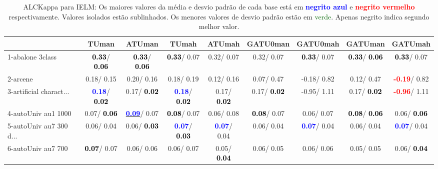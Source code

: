 \begin{table}[h]
\caption{ALCKappa para IELM: Os maiores valores da média e desvio padrão de cada base está em \textcolor{blue}{\textbf{negrito azul}} e \textcolor{red}{\textbf{negrito vermelho}} respectivamente. Valores isolados estão sublinhados. Os menores valores de desvio padrão estão em \textcolor{darkgreen}{verde}. Apenas negrito indica segundo melhor valor.}
\begin{center}\begin{tabular}{lc|c|c|c|c|c|c|c}
 & TUman & \textbf{ATUman} & TUmah & \textbf{ATUmah} & GATU0man & GATU0mah & GATUman & GATUmah\\ \hline 1-abalone 3class & \textcolor{black}{\textbf{  0.33}}/\textcolor{black}{\textbf{  0.06}} & \textcolor{black}{\textbf{  0.33}}/\textcolor{black}{\textbf{  0.06}} & \textcolor{black}{\textbf{  0.33}}/  0.07 &   0.32/  0.07 &   0.32/  0.07 & \textcolor{black}{\textbf{  0.33}}/  0.07 & \textcolor{black}{\textbf{  0.33}}/\textcolor{black}{\textbf{  0.06}} & \textcolor{black}{\textbf{  0.33}}/  0.07 \\
2-arcene &   0.18/  0.15 &   0.20/  0.16 &   0.18/  0.19 &   0.12/  0.16 &   0.07/  0.47 &  -0.18/  0.82 &   0.12/  0.47 & \textcolor{red}{\textbf{ -0.19}}/  0.82 \\
3-artificial charact... & \textcolor{blue}{\textbf{  0.18}}/\textcolor{black}{\textbf{  0.02}} &   0.17/\textcolor{black}{\textbf{  0.02}} & \textcolor{blue}{\textbf{  0.18}}/\textcolor{black}{\textbf{  0.02}} &   0.17/\textcolor{black}{\textbf{  0.02}} &   0.17/\textcolor{black}{\textbf{  0.02}} &  -0.95/  1.11 &   0.17/\textcolor{black}{\textbf{  0.02}} & \textcolor{red}{\textbf{ -0.96}}/  1.11 \\
4-autoUniv au1 1000 &   0.07/\textcolor{black}{\textbf{  0.06}} & \underline{\textcolor{blue}{\textbf{  0.09}}}/  0.07 & \textcolor{black}{\textbf{  0.08}}/  0.07 &   0.06/  0.08 & \textcolor{black}{\textbf{  0.08}}/  0.07 &   0.06/  0.07 & \textcolor{black}{\textbf{  0.08}}/\textcolor{black}{\textbf{  0.06}} &   0.06/\textcolor{black}{\textbf{  0.06}} \\
5-autoUniv au7 300 d... &   0.06/  0.04 &   0.06/\textcolor{black}{\textbf{  0.03}} & \textcolor{blue}{\textbf{  0.07}}/\textcolor{black}{\textbf{  0.03}} & \textcolor{blue}{\textbf{  0.07}}/  0.04 &   0.06/  0.04 & \textcolor{blue}{\textbf{  0.07}}/  0.04 &   0.06/  0.04 & \textcolor{blue}{\textbf{  0.07}}/  0.04 \\
6-autoUniv au7 700 & \textcolor{black}{\textbf{  0.07}}/  0.07 &   0.06/  0.06 &   0.06/  0.07 &   0.05/\textcolor{black}{\textbf{  0.04}} &   0.06/  0.05 &   0.06/  0.06 &   0.05/  0.05 &   0.06/\textcolor{black}{\textbf{  0.04}} \\

\end{tabular}
\end{center}
\end{table}
